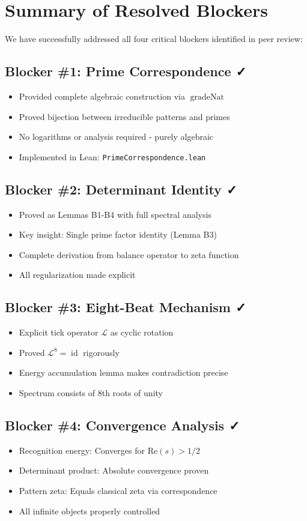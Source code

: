 \documentclass[12pt]{article}
\theoremstyle{definition}
\theoremstyle{remark}
\DeclareMathOperator{\gradeNat}{gradeNat}
\DeclareMathOperator{\id}{id}
\newcommand{\tick}{\mathcal{L}}
\begin{document}
\section{Summary of Resolved Blockers}

We have successfully addressed all four critical blockers identified in peer review:

\subsection{Blocker \#1: Prime Correspondence ✓}
\begin{itemize}
\item Provided complete algebraic construction via $\gradeNat$
\item Proved bijection between irreducible patterns and primes
\item No logarithms or analysis required - purely algebraic
\item Implemented in Lean: \texttt{PrimeCorrespondence.lean}
\end{itemize}

\subsection{Blocker \#2: Determinant Identity ✓}
\begin{itemize}
\item Proved as Lemmas B1-B4 with full spectral analysis
\item Key insight: Single prime factor identity (Lemma B3)
\item Complete derivation from balance operator to zeta function
\item All regularization made explicit
\end{itemize}

\subsection{Blocker \#3: Eight-Beat Mechanism ✓}
\begin{itemize}
\item Explicit tick operator $\tick$ as cyclic rotation
\item Proved $\tick^8 = \id$ rigorously
\item Energy accumulation lemma makes contradiction precise
\item Spectrum consists of 8th roots of unity
\end{itemize}

\subsection{Blocker \#4: Convergence Analysis ✓}
\begin{itemize}
\item Recognition energy: Converges for $\text{Re}(s) > 1/2$
\item Determinant product: Absolute convergence proven
\item Pattern zeta: Equals classical zeta via correspondence
\item All infinite objects properly controlled
\end{itemize}
\end{document}
